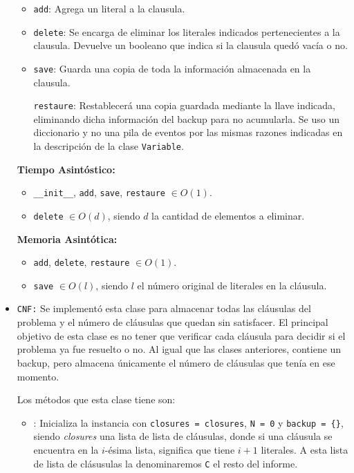 \documentclass[letterpaper,12pt]{article}
\begin{document}
\begin{itemize}
\begin{itemize}
		\item \texttt{add}: Agrega un literal a la clausula.
		
		\item \texttt{delete}: Se encarga de eliminar los literales indicados pertenecientes a la clausula. Devuelve un booleano que indica si la clausula quedó vacía o no.
	    
	    \item \texttt{save}: Guarda una copia de toda la información almacenada en la clausula.
	    
	    \texttt{restaure}: Restablecerá una copia guardada mediante la llave indicada, eliminando dicha informaci\'on del backup para no acumularla. Se uso un diccionario y no una pila de eventos por las mismas razones indicadas en la descripci\'on de la clase \texttt{Variable}.
	\end{itemize}
	
	\textbf{Tiempo Asintóstico:}
    \begin{itemize}
    	\item \texttt{\_\_init\_\_}, \texttt{add}, \texttt{save}, \texttt{restaure} $\in O(1)$.
    	
    	\item \texttt{delete} $\in O(d)$, siendo $d$ la cantidad de elementos a eliminar.
    \end{itemize} 
    
    \textbf{Memoria Asintótica:}
    \begin{itemize}
    	\item \texttt{add}, \texttt{delete}, \texttt{restaure} $\in O(1)$.
    	\item \texttt{save} $\in O(l)$, siendo $l$ el n\'umero original de literales en la cl\'ausula.
    \end{itemize}
    
    \item \texttt{CNF:} Se implement\'o esta clase para almacenar todas las cl\'ausulas del problema y el n\'umero de cl\'ausulas que quedan sin satisfacer. El principal objetivo de esta clase es no tener que verificar cada cl\'ausula para decidir si el problema ya fue resuelto o no. Al igual que las clases anteriores, contiene un backup, pero almacena \'unicamente el n\'umero de cl\'ausulas que ten\'ia en ese momento.
    
    Los métodos que esta clase tiene son:
	\begin{itemize}	   
		\item {}: Inicializa la instancia con \texttt{closures = closures}, \texttt{N = 0} y \texttt{backup = \{\}}, siendo \textit{closures} una lista de lista de cl\'ausulas, donde si una cl\'ausula se encuentra en la $i$-\'esima lista, significa que tiene $i+1$ literales. A esta lista de lista de cl\'asusulas la denominaremos \texttt{C} el resto del informe.
		 

\end{itemize}
\end{itemize}
\end{document}
